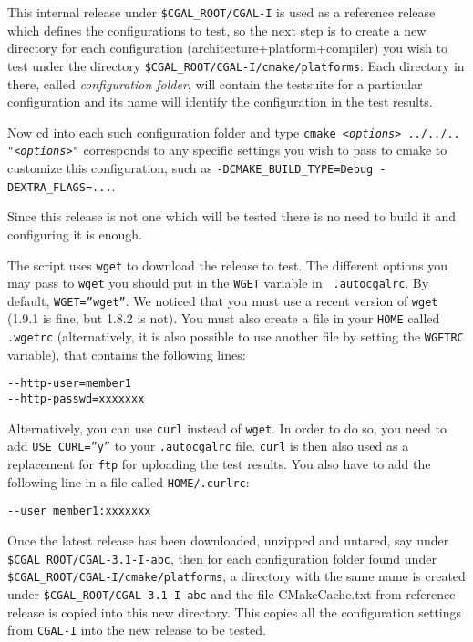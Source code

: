 This internal release under {\tt \$CGAL\_ROOT/CGAL-I} is used as a reference
release which defines the configurations to test, so the next step is to
create a new directory for each configuration (architecture+platform+compiler)
you wish to test under the directory {\tt \$CGAL\_ROOT/CGAL-I/cmake/platforms}.
Each directory in there, called {\em configuration folder}, will contain the testsuite 
for a particular configuration and its name will identify the configuration 
in the test results.

Now cd into each such configuration folder and type 
{\tt cmake {\em <options>} ../../..} 
{\tt{\em "<options>"}} corresponds to any specific settings you wish to
pass to cmake to customize this configuration, 
such as {\tt -DCMAKE\_BUILD\_TYPE=Debug -DEXTRA\_FLAGS=...}.

Since this release is not one which will be tested there is no need
to build it and configuring it is enough.


The script uses {\tt wget} to download the release to test. The different options you
may pass to {\tt wget} you should put in the {\tt WGET} variable in {\tt
.autocgalrc}. By default, {\tt WGET=''wget''}. We noticed that you must use
a recent version of {\tt wget} (1.9.1 is fine, but 1.8.2 is not). You must
also create a file in your {\tt HOME} called {\tt .wgetrc} (alternatively,
it is also possible to use another file by setting the {\tt WGETRC} variable),
that contains the following lines:
\begin{verbatim}
--http-user=member1
--http-passwd=xxxxxxx
\end{verbatim}

Alternatively, you can use {\tt curl} instead of {\tt wget}.  In order to
do so, you need to add {\tt USE\_CURL=''y''} to your {\tt .autocgalrc} file.
{\tt curl} is then also used as a replacement for {\tt ftp} for uploading the
test results.
You also have to add the following line in a file called {\tt HOME/.curlrc}:
\begin{verbatim}
--user member1:xxxxxxx
\end{verbatim}

Once the latest release has been downloaded, unzipped and untared, 
say under {\tt \$CGAL\_ROOT/CGAL-3.1-I-abc}, then for each configuration
folder found under {\tt \$CGAL\_ROOT/CGAL-I/cmake/platforms}, a directory
with the same name is created under {\tt \$CGAL\_ROOT/CGAL-3.1-I-abc}
and the file CMakeCache.txt from reference release is copied into this
new directory. This copies all the configuration settings from
{\tt CGAL-I} into the new release to be tested.

